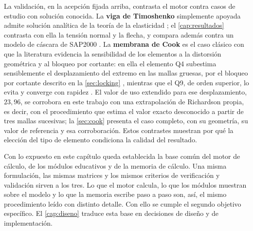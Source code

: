 La validación, en la acepción fijada arriba, contrasta el motor contra casos de estudio con solución conocida. La \textbf{viga de Timoshenko} simplemente apoyada admite solución analítica de la teoría de la elasticidad \autocite[art.~21, pp.~39-43]{timoshenko1970elasticity}; el \autoref{cap:resultados} contrasta con ella la tensión normal y la flecha, y compara además contra un modelo de cáscara de SAP2000 \autocite[p.~179]{csi2017sap2000}. La \textbf{membrana de Cook} es el caso clásico con que la literatura evidencia la sensibilidad de los elementos a la distorsión geométrica y al bloqueo por cortante: en ella el elemento Q4 subestima sensiblemente el desplazamiento del extremo en las mallas gruesas, por el bloqueo por cortante descrito en la \autoref{sec:locking} \autocite[pp.~98-99]{cook2002concepts}, mientras que el Q9, de orden superior, lo evita y converge con rapidez \autocite[p.~243]{hughes2000fem}. El valor de uso extendido para ese desplazamiento, $23{,}96$, se corrobora en este trabajo con una extrapolación de Richardson propia, es decir, con el procedimiento que estima el valor exacto desconocido a partir de tres mallas sucesivas; la \autoref{sec:cook} presenta el caso completo, con su geometría, su valor de referencia y esa corroboración. Estos contrastes muestran por qué la elección del tipo de elemento condiciona la calidad del resultado.

Con lo expuesto en este capítulo queda establecida la base común del motor de cálculo, de los módulos educativos y de la memoria de cálculo. Una misma formulación, las mismas matrices y los mismos criterios de verificación y validación sirven a los tres. Lo que el motor calcula, lo que los módulos muestran sobre el modelo y lo que la memoria escribe paso a paso son, así, el mismo procedimiento leído con distinto detalle. Con ello se cumple el segundo objetivo específico. El \autoref{cap:diseno} traduce esta base en decisiones de diseño y de implementación.
